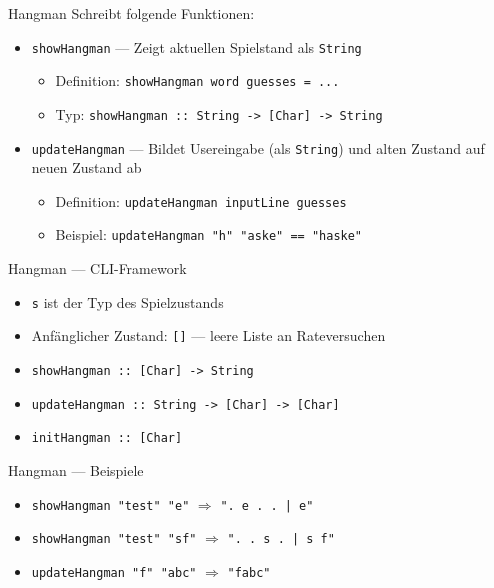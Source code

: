 \documentclass{beamer}
\begin{document}
\begin{frame}{Hangman}
        Schreibt folgende Funktionen:
	\begin{itemize}
		\item \texttt{showHangman} --- Zeigt aktuellen Spielstand als \texttt{String}
		\begin{itemize}
			\item Definition: \texttt{showHangman word guesses = ...}
			\item Typ: \texttt{showHangman :: String -> [Char] -> String}
		\end{itemize}
		\item \texttt{updateHangman} --- Bildet Usereingabe (als \texttt{String}) und alten Zustand auf neuen Zustand ab
		\begin{itemize}
			\item Definition: \texttt{updateHangman inputLine guesses}
			\item Beispiel: \texttt{updateHangman "{}h"{} "{}aske"{} == "{}haske"{}}
		\end{itemize}
	\end{itemize}
\end{frame}

\begin{frame}{Hangman --- CLI-Framework}

	\begin{itemize}
		\item \texttt{s} ist der Typ des Spielzustands
		\item Anfänglicher Zustand: \texttt{[]} --- leere Liste an Rateversuchen
                \item \texttt{showHangman :: [Char] -> String}
		\pause
                \item \texttt{updateHangman :: String -> [Char] -> [Char]}
		\pause
                \item \texttt{initHangman :: [Char]}
	\end{itemize}
\end{frame}

\begin{frame}{Hangman --- Beispiele}
	\begin{itemize}
          \item \texttt{showHangman "{}test"{} "{}e"{}} $\Rightarrow$ \texttt{"{}. e . . | e"{}}
          \item \texttt{showHangman "{}test"{} "{}sf"{}} $\Rightarrow$ \texttt{"{}. . s . | s f"{}}
          \item \texttt{updateHangman "{}f"{} "{}abc"{}} $\Rightarrow$ \texttt{"{}fabc"{}}
	\end{itemize}
\end{frame}
\end{document}

